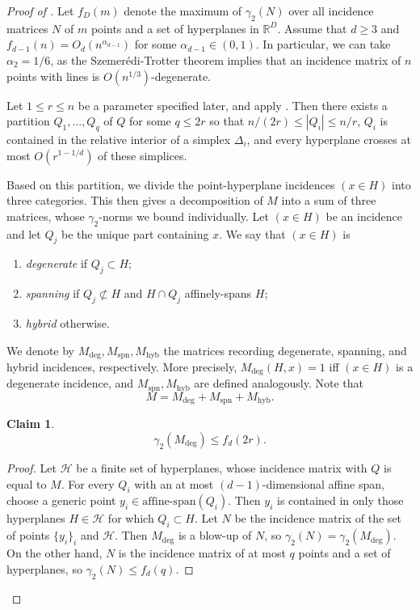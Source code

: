 \documentclass[11pt]{article}
\theoremstyle{plain}
\newtheorem{claim}[theorem]{Claim}
\theoremstyle{definition}
\begin{document}
	
	\begin{proof}[Proof of ]
		Let $f_D(m)$ denote the maximum of $\gamma_2(N)$ over all incidence matrices $N$ of $m$ points and a set of hyperplanes in $\mathbb{R}^D$. Assume that $d\geq 3$ and $f_{d-1}(n)=O_d(n^{\alpha_{d-1}})$ for some $\alpha_{d-1}\in (0,1)$. In particular, we can take $\alpha_2=1/6$, as the Szemer\'edi-Trotter theorem \cite{SzT} implies that an incidence matrix of $n$ points with lines is $O(n^{1/3})$-degenerate.
		
		Let $1\leq r\leq n$ be a parameter specified later, and apply . Then there exists a partition $Q_1,\dots,Q_q$  of $Q$ for some $q\leq 2r$ so that $n/(2r)\leq |Q_i|\leq n/r$, $Q_i$ is contained in the relative interior of a simplex $\Delta_i$, and every hyperplane crosses at most $O(r^{1-1/d})$ of these simplices. 
		
		Based on this partition, we divide the point-hyperplane incidences $(x\in H)$ into three categories. This then gives a decomposition of $M$ into a sum of three matrices, whose $\gamma_2$-norms we bound individually. Let $(x\in H)$ be an incidence and let $Q_j$ be the unique part containing $x$. We say that $(x\in H)$ is
		\begin{enumerate}
			\item  \emph{degenerate} if $Q_j\subset H$; 
			\item  \emph{spanning} if $Q_j\not\subset H$ and $H\cap Q_j$ affinely-spans $H$;
			\item \emph{hybrid} otherwise.
		\end{enumerate}
		We denote by $M_{\text{deg}},M_{\text{spn}},M_{\text{hyb}}$ the matrices recording degenerate, spanning, and hybrid incidences, respectively. More precisely, $M_{\text{deg}}(H,x)=1$ iff $(x\in H)$ is a degenerate incidence, and $M_{\text{spn}},M_{\text{hyb}}$ are defined analogously. Note that $$M=M_{\text{deg}}+M_{\text{spn}}+M_{\text{hyb}}.$$
		
		\begin{claim}
			$$\gamma_2(M_{\text{deg}})\leq f_d(2r).$$
		\end{claim}
		\begin{proof}
			Let $\mathcal{H}$ be a finite set of hyperplanes, whose incidence matrix with $Q$ is equal to $M$. For every $Q_i$ with an at most $(d-1)$-dimensional affine span, choose a generic point $y_i\in \text{affine-span}(Q_i)$. Then $y_i$ is contained in only those hyperplanes $H\in \mathcal{H}$ for which $Q_i\subset H$.  Let $N$ be the incidence matrix of the set of points $\{y_i\}_i$ and $\mathcal{H}$. Then $M_{\text{deg}}$  is a blow-up of $N$, so $\gamma_2(N)=\gamma_2(M_{\text{deg}})$. On the other hand, $N$ is the incidence matrix of at most $q$ points and a set of hyperplanes, so $\gamma_2(N)\leq f_d(q)$.
		\end{proof}
		

\end{proof}
\end{document}
